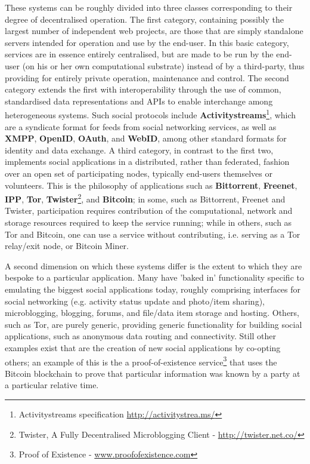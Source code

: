 \documentclass{sig-alternate}
\begin{document}
These systems can be roughly divided into three classes corresponding to their degree of decentralised operation.  The first category, containing possibly the largest number of independent web projects, are those that are simply standalone servers intended for operation and use by the end-user.  In this basic category, services are in essence entirely centralised, but are made to be run by the end-user (on his or her own computational substrate) instead of by a third-party, thus providing for entirely private operation, maintenance and control.  The second category extends the first with interoperability through the use of common, standardised data representations and APIs to enable interchange among heterogeneous systems.  Such social protocols include \textbf{Activitystreams}\footnote{Activitystreams specification \url{http://activitystrea.ms/}}, which are a syndicate format for feeds from social networking services, as well as \textbf{XMPP}, \textbf{OpenID}, \textbf{OAuth}, and \textbf{WebID}, among other standard formats for identity and data exchange.  A third category, in contrast to the first two, implements social applications in a distributed, rather than federated, fashion over an open set of participating nodes, typically end-users themselves or volunteers.  This is the philosophy of applications such as \textbf{Bittorrent}, \textbf{Freenet}, \textbf{IPP}, \textbf{Tor}, \textbf{Twister}\footnote{Twister, A Fully Decentralised Microblogging Client - \url{http://twister.net.co/}}, and \textbf{Bitcoin}; in some, such as Bittorrent, Freenet and Twister, participation requires contribution of the computational, network and storage resources required to keep the service running; while in others, such as Tor and Bitcoin, one can use a service without contributing, i.e. serving as a Tor relay/exit node, or Bitcoin Miner.

A second dimension on which these systems differ is the extent to which they are bespoke to a particular application.  Many have 'baked in' functionality specific to emulating the biggest social applications today, roughly comprising interfaces for social networking (e.g. activity status update and photo/item sharing), microblogging, blogging, forums, and file/data item storage and hosting.  Others, such as Tor, are purely generic, providing generic functionality for building social applications, such as  anonymous data routing and connectivity.  Still other examples exist that are the creation of new social applications by co-opting others; an example of this  is the a proof-of-existence service\footnote{Proof of Existence - \url{www.proofofexistence.com}} that uses the Bitcoin blockchain to prove that particular information was known by a party at a particular relative time.
\end{document}
